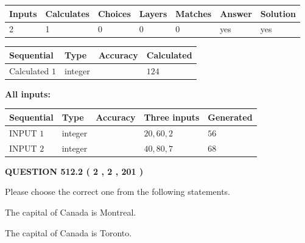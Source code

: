 \documentclass[12pt]{article}
\begin{document}
   
   
   
\noindent\begin{tabular}{|l|l|l|l|l|l|l|}
 \hline
Inputs & Calculates & Choices & Layers & Matches & Answer & Solution \\ \hline
 2  & 
 1  & 
 0
  & 
 0  & 
 0  & 
  yes & 
  yes 
  \\ \hline
 \end{tabular}
   
   
   
   
\noindent{}
   
   
  
  
\noindent\begin{tabular}{|l|l|l|l|}
\hline
 Sequential & Type & Accuracy & Calculated \\ 
\hline
 
 
  Calculated $  1 $ & integer &  & 
  $ 124 $ 
 \\  \hline  
 \end{tabular}
   
   
   
   
\noindent\vspace{0.1in}\hspace{-0.08in} {\textbf{\Large{All inputs: }}}
   
   
  
  
\noindent\begin{tabular}{|l|l|l|l|l|}
\hline
 Sequential & Type & Accuracy & Three inputs & Generated \\ 
\hline
 
 
  INPUT $  1 $ & integer &  & $
 20
 , 
 60
 , 
 2
 $ & $ 56 $ 
 \\  \hline  
 
 
  INPUT $  2 $ & integer &  & $
 40
 , 
 80
 , 
 7
 $ & $ 68 $ 
 \\  \hline  
 \end{tabular}
   
   
  
\vspace{0.2in}
  
{\textbf{\Large{QUESTION
512.2 
 ( 2 , 2 , 201 )
}}}
  
  
Please choose the correct one from the following statements.
 
 
The capital of Canada is Montreal.
 
 
The capital of Canada is Toronto.
 
\end{document}
